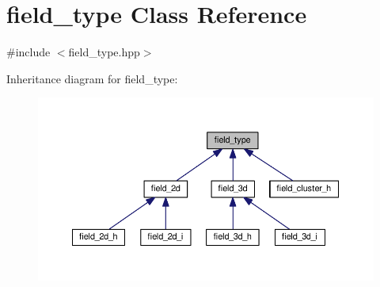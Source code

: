 \hypertarget{classfield__type}{}\section{field\+\_\+type Class Reference}
\label{classfield__type}


{\ttfamily \#include $<$field\+\_\+type.\+hpp$>$}



Inheritance diagram for field\+\_\+type\+:
\nopagebreak
\begin{figure}[H]
\begin{center}
\leavevmode
\includegraphics[width=350pt]{de/da8/classfield__type__inherit__graph}
\end{center}
\end{figure}
